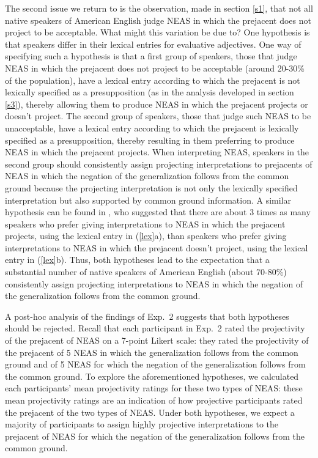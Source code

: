 \documentclass[11pt,fleqn]{article}
\newcommand{\6}{\mbox{$[\hspace*{-.6mm}[$}}
\newcommand{\9}{\mbox{$]\hspace*{-.6mm}]$}}
\begin{document}
The second issue we return to is the observation, made in section \ref{s1}, that not all native speakers of American English judge NEAS in which the prejacent does not project to be acceptable. What might this variation be due to? One hypothesis is that speakers differ in their lexical entries for evaluative adjectives. One way of specifying such a hypothesis is that a first group of speakers, those that judge NEAS in which the prejacent does not project to be acceptable (around 20-30\% of the population), have a lexical entry according to which the prejacent is not lexically specified as a presupposition (as in the analysis developed in section \ref{s3}), thereby allowing them to produce NEAS in which the prejacent projects or doesn't project. The second group of speakers, those that judge such NEAS to be unacceptable, have a lexical entry according to which the prejacent is lexically specified as a presupposition, thereby resulting in them preferring to produce NEAS in which the prejacent projects. When interpreting NEAS, speakers in the second group should consistently assign projecting interpretations to prejacents of NEAS in which the negation of the generalization follows from the common ground because the projecting interpretation is not only the lexically specified interpretation but also supported by  common ground information. A similar hypothesis can be found in \citet[243]{karttunen-etal2014}, who suggested that there are about 3 times as many speakers who prefer giving interpretations to NEAS in which the prejacent projects, using the lexical entry in (\ref{lex}a), than speakers who prefer giving interpretations to NEAS in which the prejacent doesn't project, using the lexical entry in (\ref{lex}b). Thus, both hypotheses lead to the expectation that a substantial number of native speakers of American English (about 70-80\%) consistently assign projecting interpretations to NEAS in which the negation of the generalization follows from the common ground.

A post-hoc analysis of the findings of Exp.~2 suggests that both hypotheses should be rejected. Recall that each participant in Exp.~2 rated the projectivity of the prejacent of NEAS on a 7-point Likert scale: they rated the projectivity of the prejacent of 5 NEAS in which the generalization follows from the common ground and of 5 NEAS for which the negation of the generalization follows from the common ground. To explore the aforementioned hypotheses, we calculated each participants' mean projectivity ratings for these two types of NEAS: these mean projectivity ratings are an indication of how projective participants rated the prejacent of the two types of NEAS. Under both hypotheses, we expect a majority of participants to assign highly projective interpretations to the prejacent of NEAS for which the negation of the generalization follows from the common ground. 
\end{document}
